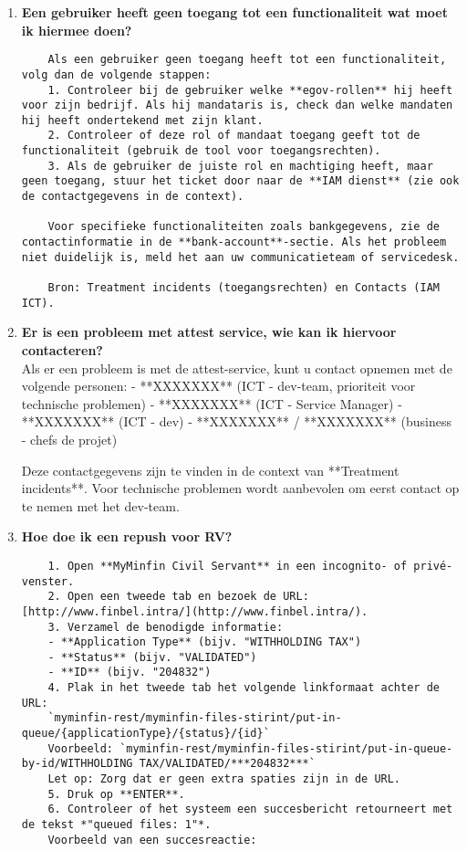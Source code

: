 \begin{enumerate}
    \item \textbf{Een gebruiker heeft geen toegang tot een functionaliteit wat moet ik hiermee doen?} \\
\begin{verbatim}
    Als een gebruiker geen toegang heeft tot een functionaliteit, volg dan de volgende stappen:  
    1. Controleer bij de gebruiker welke **egov-rollen** hij heeft voor zijn bedrijf. Als hij mandataris is, check dan welke mandaten hij heeft ondertekend met zijn klant.  
    2. Controleer of deze rol of mandaat toegang geeft tot de functionaliteit (gebruik de tool voor toegangsrechten).  
    3. Als de gebruiker de juiste rol en machtiging heeft, maar geen toegang, stuur het ticket door naar de **IAM dienst** (zie ook de contactgegevens in de context).  
    
    Voor specifieke functionaliteiten zoals bankgegevens, zie de contactinformatie in de **bank-account**-sectie. Als het probleem niet duidelijk is, meld het aan uw communicatieteam of servicedesk.  
    
    Bron: Treatment incidents (toegangsrechten) en Contacts (IAM ICT).
\end{verbatim}
    \item \textbf{Er is een probleem met attest service, wie kan ik hiervoor contacteren?} \\
    Als er een probleem is met de attest-service, kunt u contact opnemen met de volgende personen:  
    - **XXXXXXX** (ICT - dev-team, prioriteit voor technische problemen)  
    - **XXXXXXX** (ICT - Service Manager)  
    - **XXXXXXX** (ICT - dev)  
    - **XXXXXXX** / **XXXXXXX** (business - chefs de projet)  
    
    Deze contactgegevens zijn te vinden in de context van **Treatment incidents**. Voor technische problemen wordt aanbevolen om eerst contact op te nemen met het dev-team.
    
    
    \item \textbf{Hoe doe ik een repush voor RV?} \\
\begin{verbatim}
    1. Open **MyMinfin Civil Servant** in een incognito- of privé-venster.  
    2. Open een tweede tab en bezoek de URL: [http://www.finbel.intra/](http://www.finbel.intra/).  
    3. Verzamel de benodigde informatie:  
    - **Application Type** (bijv. "WITHHOLDING TAX")  
    - **Status** (bijv. "VALIDATED")  
    - **ID** (bijv. "204832")  
    4. Plak in het tweede tab het volgende linkformaat achter de URL:  
    `myminfin-rest/myminfin-files-stirint/put-in-queue/{applicationType}/{status}/{id}`  
    Voorbeeld: `myminfin-rest/myminfin-files-stirint/put-in-queue-by-id/WITHHOLDING TAX/VALIDATED/***204832***`  
    Let op: Zorg dat er geen extra spaties zijn in de URL.  
    5. Druk op **ENTER**.  
    6. Controleer of het systeem een succesbericht retourneert met de tekst *"queued files: 1"*.  
    Voorbeeld van een succesreactie:  


\end{verbatim}
\end{enumerate}
